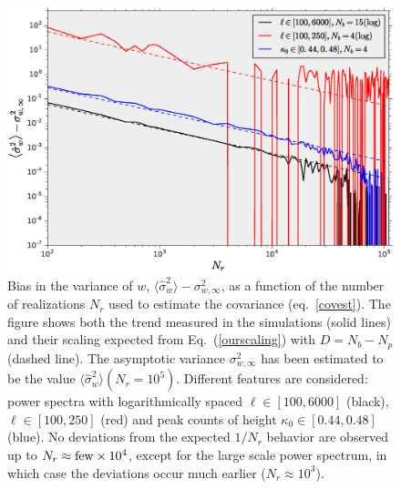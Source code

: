 \documentclass[reprint,aps,prd,superscriptaddress,showkeys,showpacs]{revtex4-1}
\newcommand{\h}[1]{\hat{#1}}
\begin{document}
\begin{figure}
\includegraphics[scale=0.3]{Figures/scaling_nr.eps}
\caption{Bias in the variance of $w$,
  $\langle\h{\sigma}^2_w\rangle-\sigma^2_{w,\infty}$, as a function of
  the number of realizations $N_r$ used to estimate the covariance
  (eq.~\ref{covest}). The figure shows both the trend measured in the
  simulations (solid lines) and their scaling expected from
  Eq.~(\ref{ourscaling}) with $D=N_b-N_p$ (dashed line). The
  asymptotic variance $\sigma^2_{w,\infty}$ has been estimated to be the value $\langle\h{\sigma}^2_w\rangle(N_r=10^5)$. Different features are considered: power spectra with logarithmically spaced $\ell\in[100,6000]$ (black), $\ell\in[100,250]$ (red) and peak counts of height $\kappa_0\in[0.44,0.48]$ (blue). No deviations from the expected $1/N_r$ behavior are observed up to $N_r\approx{\rm few}\times10^4$, except for the large scale power spectrum, in which case the deviations occur much earlier ($N_r\approx 10^3$).}
\label{wvar_nr}
\end{figure}
\end{document}
